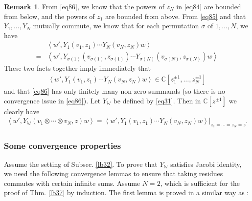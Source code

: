 \documentclass[11pt,b5paper,notitlepage]{article}
\theoremstyle{definition}
\newtheorem{rem}[df]{Remark}
\theoremstyle{plain}
\newcommand{\Wbb}{\mathbb W}
\newcommand{\Cbb}{\mathbb C}
\newcommand{\<}{\left\langle}
\renewcommand{\>}{\right\rangle}
\numberwithin{equation}{subsection}
\begin{document}
\begin{rem}\label{lb27}
From \eqref{eq86}, we know that the powers of $z_N$ in \eqref{eq84} are bounded from below, and the powers of $z_1$ are bounded from above. From \eqref{eq85} and that $Y_1,\dots,Y_N$ mutually commute, we know that for each permutation $\sigma$ of $1,\dots, N$, we have
\begin{align}
&\<w',Y_1(v_1,z_1)\cdots Y_N(v_N,z_N)w\>\nonumber\\
=&\<w',Y_{\sigma(1)}(v_{\sigma(1)},z_{\sigma(1)})\cdots Y_{\sigma(N)}(v_{\sigma(N)},z_{\sigma(N)})w\>
\end{align}
These two facts together imply immediately that
\begin{align}
\<w',Y_1(v_1,z_1)\cdots Y_N(v_N,z_N)w\>\in\Cbb[z_1^{\pm1},\dots,z_N^{\pm1}]
\end{align}
and that \eqref{eq86} has only finitely many non-zero summands (so there is no convergence issue in \eqref{eq86}). Let $Y_\Wbb$ be defined by \eqref{eq31}. Then   in $\Cbb[z^{\pm1}]$ we clearly have
\begin{align}
\<w',Y_\Wbb(v_1\otimes\cdots\otimes v_N,z)w \>=\<w',Y_1(v_1,z_1)\cdots Y_N(v_N,z_N)w\>\big|_{z_1=\cdots=z_N=z}.
\end{align}
\end{rem}



\subsubsection{Some convergence properties}






Assume the setting of Subsec. \ref{lb32}. To prove that $Y_\Wbb$ satisfies Jacobi identity, we need the following convergence lemmas to ensure that taking residues commutes with certain infinite sums. Assume $N=2$, which is sufficient for the proof of Thm. \ref{lb37} by induction. The first lemma is proved in a similar way as \cite[Prop. 3.5.1]{FHL93}:
\end{document}
